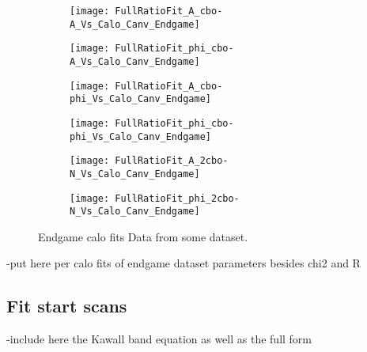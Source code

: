 \begin{figure}[]
\centering
    \begin{subfigure}[]{0.45\textwidth}
        \centering
        \texttt{[image: FullRatioFit\_A\_cbo-A\_Vs\_Calo\_Canv\_Endgame]}
        \caption{}
    \end{subfigure}%
    \begin{subfigure}[]{0.45\textwidth}
        \centering
        \texttt{[image: FullRatioFit\_phi\_cbo-A\_Vs\_Calo\_Canv\_Endgame]}
        \caption{}
    \end{subfigure}

    \begin{subfigure}[]{0.45\textwidth}
        \centering
        \texttt{[image: FullRatioFit\_A\_cbo-phi\_Vs\_Calo\_Canv\_Endgame]}
        \caption{}
    \end{subfigure}%
    \begin{subfigure}[]{0.45\textwidth}
        \centering
        \texttt{[image: FullRatioFit\_phi\_cbo-phi\_Vs\_Calo\_Canv\_Endgame]}
        \caption{}
    \end{subfigure}

    \begin{subfigure}[]{0.45\textwidth}
        \centering
        \texttt{[image: FullRatioFit\_A\_2cbo-N\_Vs\_Calo\_Canv\_Endgame]}
        \caption{}
    \end{subfigure}%
    \begin{subfigure}[]{0.45\textwidth}
        \centering
        \texttt{[image: FullRatioFit\_phi\_2cbo-N\_Vs\_Calo\_Canv\_Endgame]}
        \caption{}
    \end{subfigure}
\caption[]{Endgame calo fits Data from some dataset.}
\label{fig:}
\end{figure}



-put here per calo fits of endgame dataset parameters besides chi2 and R


\subsection{Fit start scans}

-include here the Kawall band equation as well as the full form

